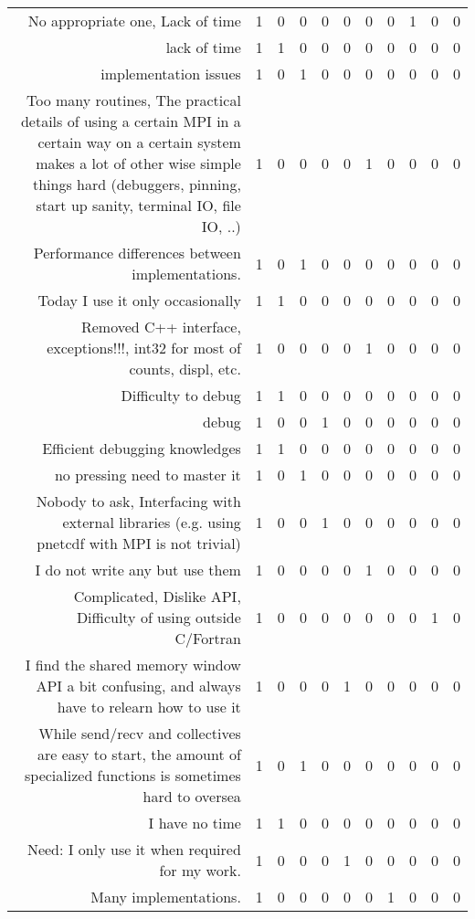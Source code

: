 {\begin{landscape}
\begin{longtable}[htb]{r|c|c|c|c|c|c|c|c|c|c}
{No appropriate one, Lack of time} & 1 & 0 & 0 & 0 & 0 & 0 & 0 & 1 & 0 & 0 \\%
{lack of time} & 1 & 1 & 0 & 0 & 0 & 0 & 0 & 0 & 0 & 0 \\%
{implementation issues} & 1 & 0 & 1 & 0 & 0 & 0 & 0 & 0 & 0 & 0 \\%
{Too many routines, The practical details of using a certain MPI in a certain way on a certain system makes a lot of other wise simple things hard (debuggers, pinning, start up sanity, terminal IO, file IO, ..)} & 1 & 0 & 0 & 0 & 0 & 1 & 0 & 0 & 0 & 0 \\%
{Performance differences between implementations.} & 1 & 0 & 1 & 0 & 0 & 0 & 0 & 0 & 0 & 0 \\%
{Today I use it only occasionally} & 1 & 1 & 0 & 0 & 0 & 0 & 0 & 0 & 0 & 0 \\%
{Removed C++ interface, exceptions!!!, int32 for most of counts, displ, etc.} & 1 & 0 & 0 & 0 & 0 & 1 & 0 & 0 & 0 & 0 \\%
{Difficulty to debug} & 1 & 1 & 0 & 0 & 0 & 0 & 0 & 0 & 0 & 0 \\%
{debug} & 1 & 0 & 0 & 1 & 0 & 0 & 0 & 0 & 0 & 0 \\%
{Efficient debugging knowledges} & 1 & 1 & 0 & 0 & 0 & 0 & 0 & 0 & 0 & 0 \\%
{no pressing need to master it} & 1 & 0 & 1 & 0 & 0 & 0 & 0 & 0 & 0 & 0 \\%
{Nobody to ask, Interfacing with external libraries (e.g. using pnetcdf with MPI is not trivial)} & 1 & 0 & 0 & 1 & 0 & 0 & 0 & 0 & 0 & 0 \\%
{I do not write any but use them} & 1 & 0 & 0 & 0 & 0 & 1 & 0 & 0 & 0 & 0 \\%
{Complicated, Dislike API, Difficulty of using outside C/Fortran} & 1 & 0 & 0 & 0 & 0 & 0 & 0 & 0 & 1 & 0 \\%
{I find the shared memory window API a bit confusing, and always have to relearn how to use it} & 1 & 0 & 0 & 0 & 1 & 0 & 0 & 0 & 0 & 0 \\%
{While send/recv and collectives are easy to start, the amount of specialized functions is sometimes hard to oversea} & 1 & 0 & 1 & 0 & 0 & 0 & 0 & 0 & 0 & 0 \\%
{I have no time} & 1 & 1 & 0 & 0 & 0 & 0 & 0 & 0 & 0 & 0 \\%
{Need: I only use it when required for my work.} & 1 & 0 & 0 & 0 & 1 & 0 & 0 & 0 & 0 & 0 \\%
{Many implementations.} & 1 & 0 & 0 & 0 & 0 & 0 & 1 & 0 & 0 & 0 \\%

\end{longtable}
\end{landscape}}

